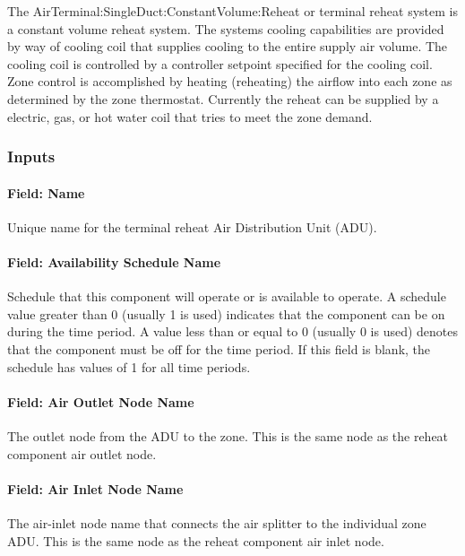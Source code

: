 The AirTerminal:SingleDuct:ConstantVolume:Reheat or terminal reheat system is a constant volume reheat system. The systems cooling capabilities are provided by way of cooling coil that supplies cooling to the entire supply air volume. The cooling coil is controlled by a controller setpoint specified for the cooling coil. Zone control is accomplished by heating (reheating) the airflow into each zone as determined by the zone thermostat. Currently the reheat can be supplied by a electric, gas, or hot water coil that tries to meet the zone demand.

\subsubsection{Inputs}\label{inputs-1-001}

\paragraph{Field: Name}\label{field-name-1-000}

Unique name for the terminal reheat Air Distribution Unit (ADU).

\paragraph{Field: Availability Schedule Name}\label{field-availability-schedule-name-1}

Schedule that this component will operate or is available to operate. A schedule value greater than 0 (usually 1 is used) indicates that the component can be on during the time period. A value less than or equal to 0 (usually 0 is used) denotes that the component must be off for the time period. If this field is blank, the schedule has values of 1 for all time periods.

\paragraph{Field: Air Outlet Node Name}\label{field-air-outlet-node-name}

The outlet node from the ADU to the zone. This is the same node as the reheat component air outlet node.

\paragraph{Field: Air Inlet Node Name}\label{field-air-inlet-node-name}

The air-inlet node name that connects the air splitter to the individual zone ADU. This is the same node as the reheat component air inlet node.

